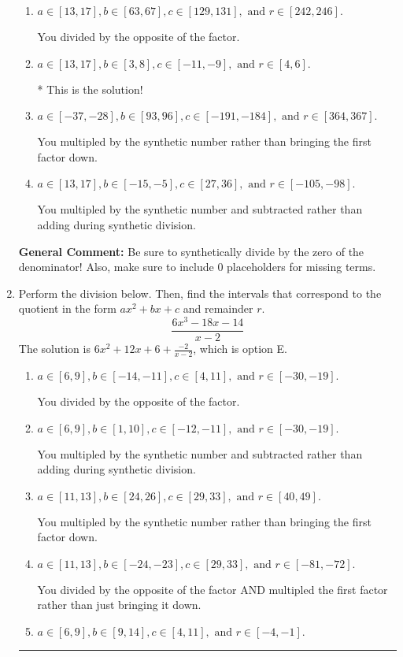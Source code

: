 \documentclass{extbook}[14pt]
\newcommand{\litem}[1]{\item #1

\rule{\textwidth}{0.4pt}}
\begin{document}
\begin{enumerate}
{\begin{enumerate}[label=\Alph*.]
 You divided by the opposite of the factor AND multipled the first factor rather than just bringing it down.
\item \( a \in [13, 17], b \in [63, 67], c \in [129, 131], \text{ and } r \in [242, 246]. \)

 You divided by the opposite of the factor.
\item \( a \in [13, 17], b \in [3, 8], c \in [-11, -9], \text{ and } r \in [4, 6]. \)

* This is the solution!
\item \( a \in [-37, -28], b \in [93, 96], c \in [-191, -184], \text{ and } r \in [364, 367]. \)

 You multipled by the synthetic number rather than bringing the first factor down.
\item \( a \in [13, 17], b \in [-15, -5], c \in [27, 36], \text{ and } r \in [-105, -98]. \)

 You multipled by the synthetic number and subtracted rather than adding during synthetic division.
\end{enumerate}

\textbf{General Comment:} Be sure to synthetically divide by the zero of the denominator! Also, make sure to include 0 placeholders for missing terms.
}
\litem{
Perform the division below. Then, find the intervals that correspond to the quotient in the form $ax^2+bx+c$ and remainder $r$.
\[ \frac{6x^{3} -18 x -14}{x -2} \]The solution is \( 6x^{2} +12 x + 6 + \frac{-2}{x -2} \), which is option E.\begin{enumerate}[label=\Alph*.]
\item \( a \in [6, 9], b \in [-14, -11], c \in [4, 11], \text{ and } r \in [-30, -19]. \)

 You divided by the opposite of the factor.
\item \( a \in [6, 9], b \in [1, 10], c \in [-12, -11], \text{ and } r \in [-30, -19]. \)

 You multipled by the synthetic number and subtracted rather than adding during synthetic division.
\item \( a \in [11, 13], b \in [24, 26], c \in [29, 33], \text{ and } r \in [40, 49]. \)

 You multipled by the synthetic number rather than bringing the first factor down.
\item \( a \in [11, 13], b \in [-24, -23], c \in [29, 33], \text{ and } r \in [-81, -72]. \)

 You divided by the opposite of the factor AND multipled the first factor rather than just bringing it down.
\item \( a \in [6, 9], b \in [9, 14], c \in [4, 11], \text{ and } r \in [-4, -1]. \)


\end{enumerate}}
\end{enumerate}
\end{document}
